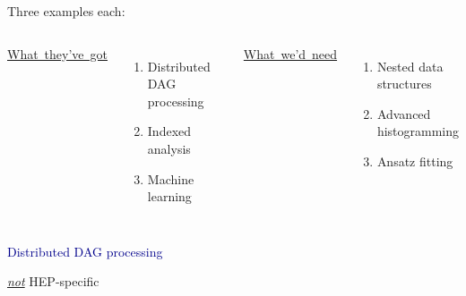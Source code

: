 \documentclass[aspectratio=169]{beamer}
\begin{document}
\begin{frame}{Three examples each:}
\Large
\vspace{0.5 cm}
\begin{columns}[t]
\mbox{\hspace{0.25 cm}\underline{What they've got}}

\vspace{0.25 cm}
\begin{enumerate}
\item Distributed DAG processing
\item Indexed analysis
\item Machine learning
\end{enumerate}

\mbox{\hspace{0.45 cm}\underline{What we'd need}}

\vspace{0.25 cm}
\begin{enumerate}
\item Nested data structures
\item Advanced histogramming
\item Ansatz fitting
\end{enumerate}

\end{columns}
\end{frame}

\begin{frame}{}
\huge
\vspace{0.5 cm}
\begin{center}
\textcolor{darkblue}{Distributed DAG processing}

\large
\vspace{0.5 cm}
\underline{\it not} HEP-specific
\end{center}
\end{frame}
\end{document}
